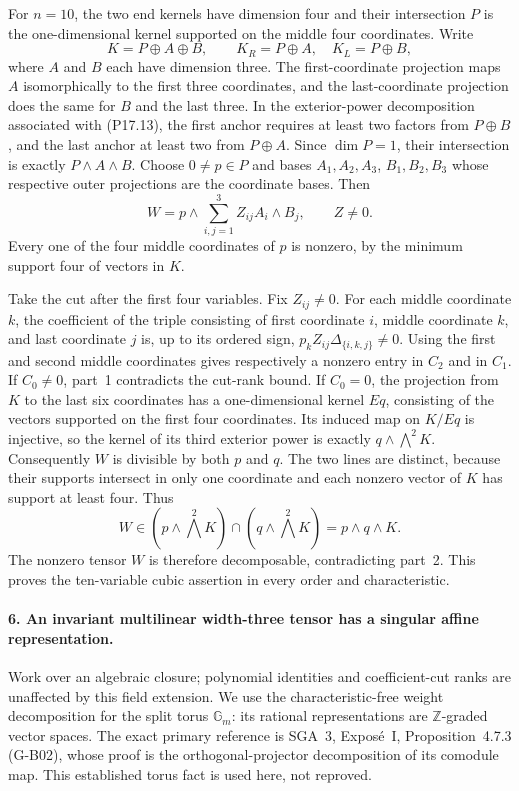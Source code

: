 For $n=10$, the two end kernels have dimension four and their
intersection $P$ is the one-dimensional kernel supported on the
middle four coordinates. Write
\[
 K=P\oplus A\oplus B,\qquad
 K_R=P\oplus A,\quad K_L=P\oplus B,
 \tag{P17.13}
\]
where $A$ and $B$ each have dimension three. The first-coordinate
projection maps $A$ isomorphically to the first three coordinates,
and the last-coordinate projection does the same for $B$ and the
last three. In the exterior-power decomposition associated with
(P17.13), the first anchor requires at least two factors from
$P\oplus B$, and the last anchor at least two from $P\oplus A$.
Since $\dim P=1$, their intersection is exactly
$P\wedge A\wedge B$. Choose $0\ne p\in P$ and bases
$A_1,A_2,A_3$, $B_1,B_2,B_3$ whose respective outer projections
are the coordinate bases. Then
\[
 W=p\wedge\sum_{i,j=1}^3 Z_{ij}A_i\wedge B_j,
 \qquad Z\ne0.
 \tag{P17.14}
\]
Every one of the four middle coordinates of $p$ is nonzero,
by the minimum support four of vectors in $K$.

Take the cut after the first four variables. Fix $Z_{ij}\ne0$.
For each middle coordinate $k$, the coefficient of the triple
consisting of first coordinate $i$, middle coordinate $k$, and
last coordinate $j$ is, up to its ordered sign,
$p_kZ_{ij}\Delta_{\{i,k,j\}}\ne0$. Using the first and second
middle coordinates gives respectively a nonzero entry in $C_2$
and in $C_1$. If $C_0\ne0$, part~1 contradicts the cut-rank
bound. If $C_0=0$, the projection from $K$ to the last six
coordinates has a one-dimensional kernel $Eq$, consisting of
the vectors supported on the first four coordinates. Its
induced map on $K/Eq$ is injective, so the kernel of its third
exterior power is exactly $q\wedge\bigwedge^2K$. Consequently
$W$ is divisible by both $p$ and $q$. The two lines are distinct,
because their supports intersect in only one coordinate and
each nonzero vector of $K$ has support at least four. Thus
\[
 W\in\left(p\wedge\bigwedge^2K\right)
       \cap\left(q\wedge\bigwedge^2K\right)
   =p\wedge q\wedge K.
\]
The nonzero tensor $W$ is therefore decomposable, contradicting
part~2. This proves the ten-variable cubic assertion in every
order and characteristic.

\paragraph{6. An invariant multilinear width-three tensor has a singular affine representation.}
Work over an algebraic closure; polynomial identities and
coefficient-cut ranks are unaffected by this field extension.
We use the characteristic-free weight decomposition for the split
torus $\mathbb G_m$: its rational representations are
$\mathbb Z$-graded vector spaces. The exact primary reference is
SGA~3, Expos\'e~I, Proposition~4.7.3 (G-B02), whose proof is the
orthogonal-projector decomposition of its comodule map. This
established torus fact is used here, not reproved.


